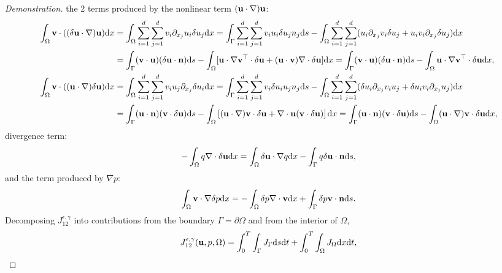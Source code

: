 \documentclass[oneside,11pt]{book}
\numberwithin{equation}{section}
\begin{document}
\begin{proof}[Demonstration]
    the 2 terms produced by the nonlinear term $({\bf u}\cdot\nabla){\bf u}$:
    \begin{align}
        \int_\Omega {\bf v}\cdot((\delta{\bf u}\cdot\nabla){\bf u}){\rm d}x &= \int_\Omega \sum_{i=1}^d\sum_{j=1}^d v_i\partial_{x_j}u_i\delta u_j{\rm d}x = \int_\Gamma \sum_{i=1}^d\sum_{j=1}^d v_iu_i\delta u_jn_j{\rm d}s - \int_\Omega \sum_{i=1}^d\sum_{j=1}^d (u_i\partial_{x_j}v_i\delta u_j + u_iv_i\partial_{x_j}\delta u_j){\rm d}x\\
        &= \int_\Gamma ({\bf v}\cdot{\bf u})(\delta{\bf u}\cdot{\bf n}){\rm d}s - \int_\Omega [{\bf u}\cdot\nabla{\bf v}^\top\cdot\delta{\bf u} + ({\bf u}\cdot{\bf v})\nabla\cdot\delta{\bf u}]{\rm d}x = \int_\Gamma ({\bf v}\cdot{\bf u})(\delta{\bf u}\cdot{\bf n}){\rm d}s - \int_\Omega {\bf u}\cdot\nabla{\bf v}^\top\cdot\delta{\bf u}{\rm d}x,\\
        \int_\Omega {\bf v}\cdot(({\bf u}\cdot\nabla)\delta{\bf u}){\rm d}x &= \int_\Omega \sum_{i=1}^d\sum_{j=1}^d v_iu_j\partial_{x_j}\delta u_i{\rm d}x = \int_\Gamma \sum_{i=1}^d\sum_{j=1}^d v_i\delta u_iu_jn_j{\rm d}s - \int_\Omega \sum_{i=1}^d\sum_{j=1}^d (\delta u_i\partial_{x_j}v_iu_j + \delta u_iv_i\partial_{x_j}u_j){\rm d}x\\
        &= \int_\Gamma ({\bf u}\cdot{\bf n})({\bf v}\cdot\delta{\bf u}){\rm d}s - \int_\Omega \left[({\bf u}\cdot\nabla){\bf v}\cdot\delta{\bf u} + \nabla\cdot{\bf u}({\bf v}\cdot\delta{\bf u})\right]{\rm d}x = \int_\Gamma ({\bf u}\cdot{\bf n})({\bf v}\cdot\delta{\bf u}){\rm d}s - \int_\Omega ({\bf u}\cdot\nabla){\bf v}\cdot\delta{\bf u}{\rm d}x,
    \end{align}
    divergence term:
    \begin{align}
        -\int_\Omega q\nabla\cdot\delta{\bf u}{\rm d}x = \int_\Omega \delta{\bf u}\cdot\nabla q{\rm d}x - \int_\Gamma q\delta{\bf u}\cdot{\bf n}{\rm d}s,
    \end{align}
    and the term produced by $\nabla p$:
    \begin{align}
        \int_\Omega {\bf v}\cdot\nabla\delta p{\rm d}x = -\int_\Omega \delta p\nabla\cdot{\bf v}{\rm d}x + \int_\Gamma \delta p{\bf v}\cdot{\bf n}{\rm d}s.
    \end{align}
    Decomposing $J_{12}^{\epsilon,\gamma}$ into contributions from the boundary $\Gamma = \partial\Omega$ and from the interior of $\Omega$,
    \begin{align}
        J_{12}^{\epsilon,\gamma}({\bf u},p,\Omega) = \int_0^T\int_\Gamma J_\Gamma{\rm d}s{\rm d}t + \int_0^T\int_\Omega J_\Omega{\rm d}x{\rm d}t,

\end{align}
\end{proof}
\end{document}

